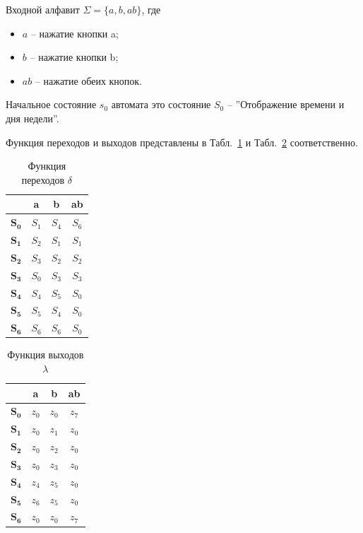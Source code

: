 \documentclass[a4paper, final]{article}
\begin{document}
Входной алфавит $\Sigma = \{a, b, ab\}$, где
\begin{itemize}
  \item $a$ -- нажатие кнопки a;
  \item $b$ -- нажатие кнопки b;
  \item $ab$ -- нажатие обеих кнопок.
\end{itemize}

Начальное состояние $s_0$ автомата это состояние $S_0$ -- ''Отображение времени и дня недели''. 

Функция переходов и выходов представлены в Табл.~\ref{tbl:perehod_d} и Табл.~\ref{tbl:vihod_l} соответственно.

\begin{table}[h!]
    \centering
    \caption{Функция переходов $\delta$}
    \label{tbl:perehod_d}
    \footnotesize
    \begin{tabular}{|c|c|c|c|}
    \hline
          & \textbf{a} & \textbf{b} & \textbf{ab} \\
    \hline
    $\mathbf{S_0}$ & $S_1$ & $S_4$ & $S_6$ \\
    \hline
    $\mathbf{S_1}$ & $S_2$ & $S_1$ & $S_1$ \\
    \hline
    $\mathbf{S_2}$ & $S_3$ & $S_2$ & $S_2$ \\
    \hline
    $\mathbf{S_3}$ & $S_0$ & $S_3$ & $S_3$ \\
    \hline
    $\mathbf{S_4}$ & $S_4$ & $S_5$ & $S_0$ \\
    \hline
    $\mathbf{S_5}$ & $S_5$ & $S_4$ & $S_0$ \\
    \hline
    $\mathbf{S_6}$ & $S_6$ & $S_6$ & $S_0$\\
    \hline
    \end{tabular}
\end{table}

\begin{table}[h!]
  \centering
  \caption{Функция выходов $\lambda$}
  \label{tbl:vihod_l}
  \footnotesize
  \begin{tabular}{|c|c|c|c|}
  \hline
        & \textbf{a} & \textbf{b} & \textbf{ab} \\
  \hline
  $\mathbf{S_0}$ & $z_0$ & $z_0$ & $z_7$ \\
  \hline
  $\mathbf{S_1}$ & $z_0$ & $z_1$ & $z_0$ \\
  \hline
  $\mathbf{S_2}$ & $z_0$ & $z_2$ & $z_0$ \\
  \hline
  $\mathbf{S_3}$ & $z_0$ & $z_3$ & $z_0$ \\
  \hline
  $\mathbf{S_4}$ & $z_4$ & $z_5$ & $z_0$ \\
  \hline
  $\mathbf{S_5}$ & $z_6$ & $z_5$ & $z_0$ \\
  \hline
  $\mathbf{S_6}$ & $z_0$ & $z_0$ & $z_7$\\
  \hline
  \end{tabular}
\end{table}
\end{document}

